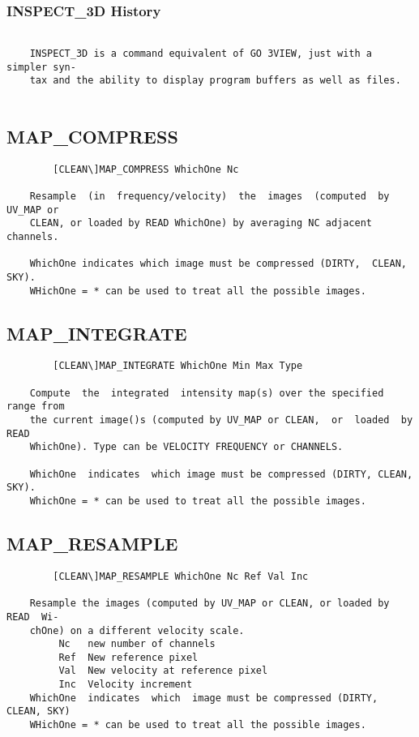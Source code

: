 \subsubsection{INSPECT\_3D History}
\begin{verbatim}

    INSPECT_3D is a command equivalent of GO 3VIEW, just with a simpler syn-
    tax and the ability to display program buffers as well as files.


\end{verbatim}
\subsection{MAP\_COMPRESS}
\begin{verbatim}
        [CLEAN\]MAP_COMPRESS WhichOne Nc

    Resample  (in  frequency/velocity)  the  images  (computed  by UV_MAP or
    CLEAN, or loaded by READ WhichOne) by averaging NC adjacent channels.

    WhichOne indicates which image must be compressed (DIRTY,  CLEAN,  SKY).
    WHichOne = * can be used to treat all the possible images.

\end{verbatim}
\subsection{MAP\_INTEGRATE}
\begin{verbatim}
        [CLEAN\]MAP_INTEGRATE WhichOne Min Max Type

    Compute  the  integrated  intensity map(s) over the specified range from
    the current image()s (computed by UV_MAP or CLEAN,  or  loaded  by  READ
    WhichOne). Type can be VELOCITY FREQUENCY or CHANNELS.

    WhichOne  indicates  which image must be compressed (DIRTY, CLEAN, SKY).
    WhichOne = * can be used to treat all the possible images.

\end{verbatim}
\subsection{MAP\_RESAMPLE}
\begin{verbatim}
        [CLEAN\]MAP_RESAMPLE WhichOne Nc Ref Val Inc

    Resample the images (computed by UV_MAP or CLEAN, or loaded by READ  Wi-
    chOne) on a different velocity scale.
         Nc   new number of channels
         Ref  New reference pixel
         Val  New velocity at reference pixel
         Inc  Velocity increment
    WhichOne  indicates  which  image must be compressed (DIRTY, CLEAN, SKY)
    WHichOne = * can be used to treat all the possible images.

\end{verbatim}
